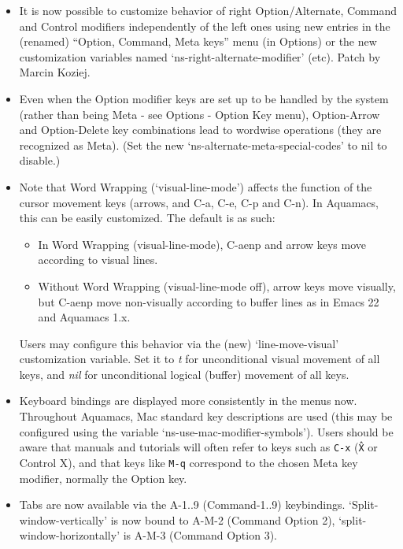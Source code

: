 \begin{itemize}


\item It is now possible to customize behavior of right Option/Alternate, Command and Control modifiers independently of the left ones using new entries in the (renamed) ``Option, Command, Meta keys'' menu (in Options) or the new customization variables named `ns-right-alternate-modifier' (etc).  
Patch by Marcin Koziej.

\item Even when the Option modifier keys are set up to be handled by the system (rather than being Meta - see Options - Option Key menu), Option-Arrow and Option-Delete key combinations lead to wordwise operations (they are recognized as Meta).  (Set the new `ns-alternate-meta-special-codes'  to nil to disable.)

\item Note that Word Wrapping (`visual-line-mode') affects the function of the cursor movement keys (arrows, and C-a, C-e, C-p and C-n).  In Aquamacs, this can be easily customized.  The default is as such:  
\begin{itemize}
\item In Word Wrapping (visual-line-mode), C-aenp and arrow keys move according to visual lines.
\item Without Word Wrapping (visual-line-mode off), arrow keys move visually, but C-aenp move non-visually according to buffer lines as in Emacs 22 and Aquamacs 1.x.
\end{itemize}
Users may configure this behavior via the (new) `line-move-visual' customization variable.  Set it to \emph{t} for unconditional visual movement of all keys, and \emph{nil} for unconditional logical (buffer) movement of all keys.

\item Keyboard bindings are displayed more consistently in the menus now.  Throughout Aquamacs,  Mac standard key descriptions are used (this may be configured using the variable `ns-use-mac-modifier-symbols').  Users should be aware that manuals and tutorials will often refer to keys such as {\tt C-x} ({\tt \^X} or Control X), and that keys like {\tt M-q} correspond to the chosen Meta key modifier, normally the Option key. 

\item Tabs are now available via the A-1..9 (Command-1..9) keybindings.  `Split-window-vertically' is now bound to A-M-2 (Command Option 2), `split-window-horizontally' is A-M-3 (Command Option 3).


\end{itemize}
